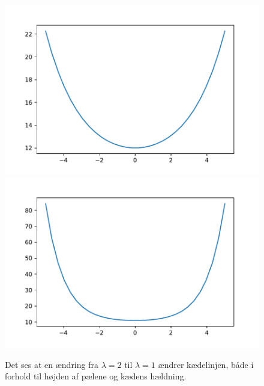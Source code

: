 %
\begin{figure}[h!]
\includegraphics[scale=0.5]{code/fig3}
\includegraphics[scale=0.5]{code/fig4}
\caption{Det ses at en ændring fra $\lambda=2$ til $\lambda=1$ ændrer kædelinjen, både i forhold til højden af pælene og kædens hældning.}
\end{figure}
%